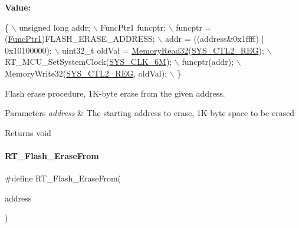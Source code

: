{\bfseries Value\+:}
\begin{DoxyCode}
\{                                                   \(\backslash\)
        unsigned \textcolor{keywordtype}{long} addr;                             \(\backslash\)
        FuncPtr1 funcptr;                               \(\backslash\)
        funcptr =  (\mbox{\hyperlink{a00020_a0891965816a5b721b07f7bebefaf7430}{FuncPtr1}})FLASH\_ERASE\_ADDRESS;       \(\backslash\)
        addr = ((address&0x1ffff) | 0x10100000);        \(\backslash\)
        uint32\_t oldVal = \mbox{\hyperlink{a00020_a2d484dc15bdf30ee11ab3b05f31f0e16}{MemoryRead32}}(\mbox{\hyperlink{a00020_adadaa0ab1ebbd7ba9b70dfd24c3ed44da7dd70f67b5962a7974603376399afb49}{SYS\_CTL2\_REG}});   \(\backslash\)
        RT\_MCU\_SetSystemClock(\mbox{\hyperlink{a00020_ae3a2d501b8662e11b969fb4a5e195e5bad1640aa8c46162a7551abca12293ef39}{SYS\_CLK\_6M}});              \(\backslash\)
        funcptr(addr);                                  \(\backslash\)
        MemoryWrite32(\mbox{\hyperlink{a00020_adadaa0ab1ebbd7ba9b70dfd24c3ed44da7dd70f67b5962a7974603376399afb49}{SYS\_CTL2\_REG}}, oldVal);            \(\backslash\)
    \}
\end{DoxyCode}


Flash erase procedure, 1\+K-\/byte erase from the given address. 


\begin{DoxyParams}{Parameters}
{\em address} & The starting address to erase, 1\+K-\/byte space to be erased \\
\hline
\end{DoxyParams}
\begin{DoxyReturn}{Returns}
void 
\end{DoxyReturn}
\mbox{\label{a00008_afb9cdf54d7254cfef685cd4012113b27}} 
\paragraph{\texorpdfstring{R\+T\+\_\+\+Flash\+\_\+\+Erase\+From}{RT\_Flash\_EraseFrom}}
{\footnotesize\ttfamily \#define R\+T\+\_\+\+Flash\+\_\+\+Erase\+From(\begin{DoxyParamCaption}\item[{}]{address }\end{DoxyParamCaption})}

